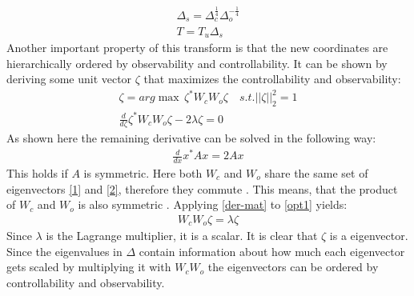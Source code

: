 \begin{gather}
\Delta_s = \Delta_c^{\frac{1}{4}}\Delta_o^{-\frac{1}{4}} \\
T = T_u \Delta_s
\end{gather}
Another important property of this transform is that the new coordinates are hierarchically ordered by observability and controllability.
It can be shown by deriving some unit vector \(\zeta\) that maximizes the controllability and observability:
\begin{gather}
\zeta = arg\max \, \zeta^{*}W_cW_o\zeta \quad s.t. ||\zeta||_2^{2} = 1 \\
\frac{d}{d\zeta} \zeta^{*}W_cW_o\zeta - 2\lambda \zeta = 0 \label{opt1}
\end{gather}
As shown here \cite{170373} the remaining derivative can be solved in the following way:
\begin{gather}
\frac{d}{dx} x^{*}Ax = 2Ax \label{der-mat}
\end{gather}
This holds if \(A\) is symmetric. 
Here both \(W_c\) and \(W_o\) share the same set of eigenvectors \ref{1} and \ref{2}, therefore they commute \cite{170371}.
This means, that the product of \(W_c\) and \(W_o\) is also symmetric \cite{170372}.
Applying \ref{der-mat} to \ref{opt1} yields:
\begin{gather}
W_cW_o\zeta = \lambda \zeta
\end{gather}
Since \(\lambda\) is the Lagrange multiplier, it is a scalar. 
It is clear that \(\zeta\) is a eigenvector.
Since the eigenvalues in \(\Delta\) contain information about how much each eigenvector gets scaled by multiplying it with \(W_cW_o\) the eigenvectors can be ordered by controllability and observability.

